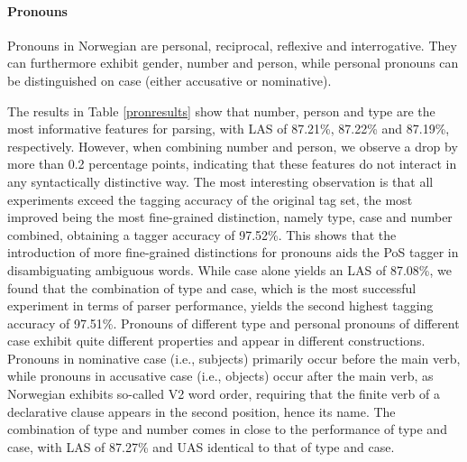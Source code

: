 \documentclass[11pt,a4paper]{article}
\begin{document}
\paragraph{Pronouns}
Pronouns in Norwegian are personal, reciprocal, reflexive and interrogative.
They can furthermore exhibit gender, number and person, while personal pronouns
can be distinguished on case (either accusative or nominative).

The results in Table \ref{pronresults} show that number, person and type are
the most informative features for parsing, with LAS of 87.21\%, 87.22\% and
87.19\%, respectively. However, when combining number and person, we observe a
drop by more than 0.2 percentage points, indicating that these features do not
interact in any syntactically distinctive way. The most interesting observation
is that all experiments exceed the tagging accuracy of the original tag set,
the most improved being the most fine-grained distinction, namely type, case
and number combined, obtaining a tagger accuracy of 97.52\%. This shows that
the introduction of more fine-grained distinctions for pronouns aids the PoS
tagger in disambiguating ambiguous words. While case alone yields an LAS of
87.08\%, we found that the combination of type and case, which is the most
successful experiment in terms of parser performance, yields the second highest
tagging accuracy of 97.51\%. Pronouns of different type and personal pronouns
of different case exhibit quite different properties and appear in different
constructions. Pronouns in nominative case (i.e., subjects) primarily occur
before the main verb, while pronouns in accusative case (i.e., objects) occur
after the main verb, as Norwegian exhibits so-called V2 word order, requiring
that the finite verb of a declarative clause appears in the second position,
hence its name. The combination of type and number comes in close to the
performance of type and case, with LAS of 87.27\% and UAS identical to that of
type and case.
\end{document}
